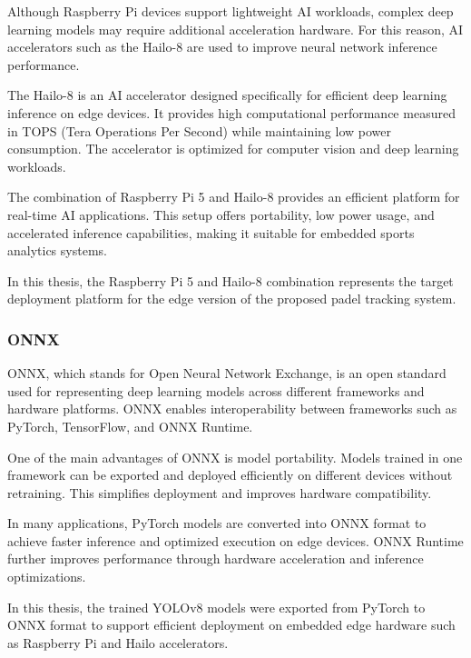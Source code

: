 Although Raspberry Pi devices support lightweight AI workloads, complex deep learning models may require additional acceleration hardware. For this reason, AI accelerators such as the Hailo-8 are used to improve neural network inference performance.

The Hailo-8 is an AI accelerator designed specifically for efficient deep learning inference on edge devices. It provides high computational performance measured in TOPS (Tera Operations Per Second) while maintaining low power consumption. The accelerator is optimized for computer vision and deep learning workloads.

The combination of Raspberry Pi 5 and Hailo-8 provides an efficient platform for real-time AI applications. This setup offers portability, low power usage, and accelerated inference capabilities, making it suitable for embedded sports analytics systems.

In this thesis, the Raspberry Pi 5 and Hailo-8 combination represents the target deployment platform for the edge version of the proposed padel tracking system.

\subsubsection{ONNX}

ONNX, which stands for Open Neural Network Exchange, is an open standard used for representing deep learning models across different frameworks and hardware platforms. ONNX enables interoperability between frameworks such as PyTorch, TensorFlow, and ONNX Runtime.

One of the main advantages of ONNX is model portability. Models trained in one framework can be exported and deployed efficiently on different devices without retraining. This simplifies deployment and improves hardware compatibility.

In many applications, PyTorch models are converted into ONNX format to achieve faster inference and optimized execution on edge devices. ONNX Runtime further improves performance through hardware acceleration and inference optimizations.

In this thesis, the trained YOLOv8 models were exported from PyTorch to ONNX format to support efficient deployment on embedded edge hardware such as Raspberry Pi and Hailo accelerators.
